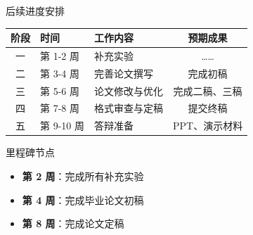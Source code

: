 \begin{frame}{后续进度安排}
    \begin{table}
        \centering
        \begin{tabular}{cllc}
            \toprule
            \textbf{阶段} & \textbf{时间} & \textbf{工作内容} & \textbf{预期成果} \\
            \midrule
            \rowcolor{lightblue}
            一 & 第 1-2 周 & 补充实验 & …… \\
            二 & 第 3-4 周 & 完善论文撰写 & 完成初稿 \\
            \rowcolor{lightblue}
            三 & 第 5-6 周 & 论文修改与优化 & 完成二稿、三稿 \\
            四 & 第 7-8 周 & 格式审查与定稿 & 提交终稿 \\
            \rowcolor{lightblue}
            五 & 第 9-10 周 & 答辩准备 & PPT、演示材料 \\
            \bottomrule
        \end{tabular}
    \end{table}

    \vspace{0.5em}

    \begin{exampleblock}{\normalsize 里程碑节点}
        \begin{itemize}
            \item \textbf{\color{accentgreen}第 2 周}：完成所有补充实验
            \item \textbf{\color{accentgreen}第 4 周}：完成毕业论文初稿
            \item \textbf{\color{accentgreen}第 8 周}：完成论文定稿
        \end{itemize}
    \end{exampleblock}
\end{frame}

